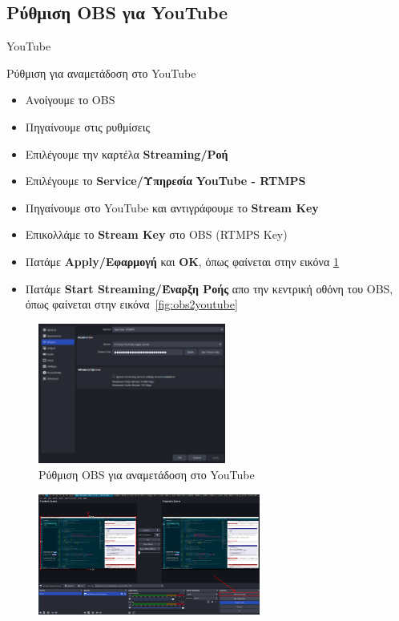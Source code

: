 \documentclass[aspectratio=169]{beamer}
\begin{document}
\subsection{Ρύθμιση OBS για YouTube}
\begin{frame}[allowframebreaks]{YouTube}
  \begin{block}{Ρύθμιση για αναμετάδοση στο YouTube}
    \begin{itemize}
      \item Ανοίγουμε το OBS
      \item Πηγαίνουμε στις ρυθμίσεις
      \item Επιλέγουμε την καρτέλα \textbf{Streaming/Ροή}
      \item Επιλέγουμε το \textbf{Service/Υπηρεσία} \textbf{YouTube - RTMPS}
      \item Πηγαίνουμε στο YouTube και αντιγράφουμε το \textbf{Stream Key}
      \item Επικολλάμε το \textbf{Stream Key} στο OBS (RTMPS Key)
      \item Πατάμε \textbf{Apply/Εφαρμογή} και \textbf{OK}, όπως φαίνεται στην εικόνα \ref{fig:settings}
      \item Πατάμε \textbf{Start Streaming/Έναρξη Ροής} απο την κεντρική οθόνη του OBS, όπως φαίνεται στην εικόνα~\ref{fig:obs2youtube}
    \end{itemize}
  \end{block}
  \begin{figure}
    \includegraphics[width=0.55\textwidth]{images/settings.png}
    \caption{Ρύθμιση OBS για αναμετάδοση στο YouTube}
    \label{fig:settings}
  \end{figure}
  \begin{figure}
    \includegraphics[width=0.65\textwidth]{images/obs2youtube.png}

\end{figure}
\end{frame}
\end{document}
